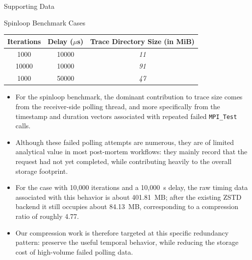 \documentclass[10pt,aspectratio=169]{beamer}
\begin{document}
\begin{frame}{Supporting Data}
  \small
  \begin{block}{Spinloop Benchmark Cases}
    \centering
    \begin{tabular}{|c|c|c|}
      \hline
      Iterations & Delay ($\mu$s) & Trace Directory Size (in MiB) \\
      \hline
      1000 & 10000 & \textit{11} \\
      \hline
      10000 & 10000 & \textit{91} \\
      \hline
      1000 & 50000 & \textit{47} \\
      \hline
    \end{tabular}
  \end{block}

  \vspace{0.5em}
  \begin{itemize}
    \item For the spinloop benchmark, the dominant contribution to trace size comes from the receiver-side polling thread, and more specifically from the timestamp and duration vectors associated with repeated failed \texttt{MPI\_Test} calls.
    \item Although these failed polling attempts are numerous, they are of limited analytical value in most post-mortem workflows: they mainly record that the request had not yet completed, while contributing heavily to the overall storage footprint.
    \item For the case with 10{,}000 iterations and a 10{,}000~\textmu s delay, the raw timing data associated with this behavior is about 401.81~MB; after the existing ZSTD backend it still occupies about 84.13~MB, corresponding to a compression ratio of roughly 4.77.
    \item Our compression work is therefore targeted at this specific redundancy pattern: preserve the useful temporal behavior, while reducing the storage cost of high-volume failed polling data.
  \end{itemize}
\end{frame}
\end{document}
